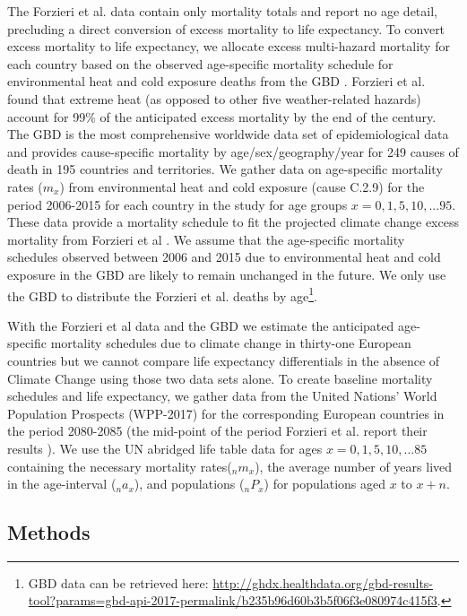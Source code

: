 \documentclass[12pt]{article}
\begin{document}
The Forzieri et al. \citeyearpar{forzieri2017increasing} data contain
only mortality totals and report no age detail, precluding a direct
conversion of excess mortality to life expectancy. To convert excess
mortality to life expectancy, we allocate excess multi-hazard mortality
for each country based on the observed age-specific mortality schedule
for environmental heat and cold exposure deaths from the GBD
\citep{GBD, wang2012age}. Forzieri et al. found that extreme heat (as
opposed to other five weather-related hazards) account for 99\% of the
anticipated excess mortality by the end of the century. The GBD is the
most comprehensive worldwide data set of epidemiological data and
provides cause-specific mortality by age/sex/geography/year for 249
causes of death in 195 countries and territories. We gather data on
age-specific mortality rates (\(m_x\)) from environmental heat and cold
exposure (cause C.2.9) for the period 2006-2015 for each country in the
study for age groups \(x=0,1,5,10,...95\). These data provide a
mortality schedule to fit the projected climate change excess mortality
from Forzieri et al \citep{forzieri2017increasing}. We assume that the
age-specific mortality schedules observed between 2006 and 2015 due to
environmental heat and cold exposure in the GBD are likely to remain
unchanged in the future. We only use the GBD to distribute the Forzieri
et al. deaths by age\footnote{GBD data can be retrieved here:
  \url{http://ghdx.healthdata.org/gbd-results-tool?params=gbd-api-2017-permalink/b235b96d60b3b5f06f3e080974c415f3}.}.

With the Forzieri et al data and the GBD we estimate the anticipated
age-specific mortality schedules due to climate change in thirty-one
European countries but we cannot compare life expectancy differentials
in the absence of Climate Change using those two data sets alone. To
create baseline mortality schedules and life expectancy, we gather data
from the United Nations' World Population Prospects (WPP-2017)
\citep{united2017world} for the corresponding European countries in the
period 2080-2085 (the mid-point of the period Forzieri et al. report
their results \citeyearpar{forzieri2017increasing}). We use the UN
abridged life table data for ages \(x=0,1,5,10,...85\) containing the
necessary mortality rates(\(_nm_x\)), the average number of years lived
in the age-interval (\(_na_x\)), and populations (\(_nP_x\)) for
populations aged \(x\) to \(x+n\).

\subsection{Methods}\label{methods}
\end{document}
